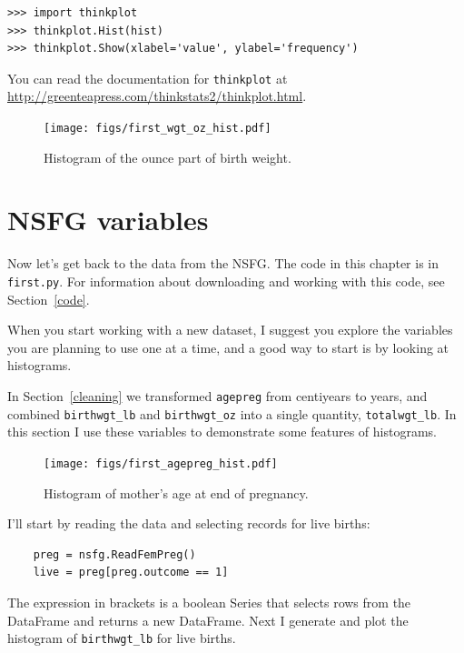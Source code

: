 \documentclass[12pt]{book}
\theoremstyle{exercise}
\begin{document}
\begin{verbatim}
>>> import thinkplot
>>> thinkplot.Hist(hist)
>>> thinkplot.Show(xlabel='value', ylabel='frequency')
\end{verbatim}

You can read the documentation for {\tt thinkplot} at
\url{http://greenteapress.com/thinkstats2/thinkplot.html}.


\begin{figure}
\centerline{\texttt{[image: figs/first\_wgt\_oz\_hist.pdf]}}
\caption{Histogram of the ounce part of birth weight.}%
\label{first_wgt_oz_hist}
\end{figure}


\section{NSFG variables}

Now let's get back to the data from the NSFG.  The code in this
chapter is in {\tt first.py}.  
For information about downloading and
working with this code, see Section~\ref{code}.

When you start working with a new dataset, I suggest you explore
the variables you are planning to use one at a time, and a good
way to start is by looking at histograms.%

In Section~\ref{cleaning} we transformed {\tt agepreg}
from centiyears to years, and combined \verb"birthwgt_lb" and
\verb"birthwgt_oz" into a single quantity, \verb"totalwgt_lb".
In this section I use these variables to demonstrate some
features of histograms.

\begin{figure}
\centerline{\texttt{[image: figs/first\_agepreg\_hist.pdf]}}
\caption{Histogram of mother's age at end of pregnancy.}%
\label{first_agepreg_hist}
\end{figure}

I'll start by reading the data and selecting records for live
births:

\begin{verbatim}
    preg = nsfg.ReadFemPreg()
    live = preg[preg.outcome == 1]
\end{verbatim}

The expression in brackets is a boolean Series that
selects rows from the DataFrame and returns a new DataFrame.
Next I generate and plot the histogram of
\verb"birthwgt_lb" for live births.%
%
%
%
%
\end{document}
